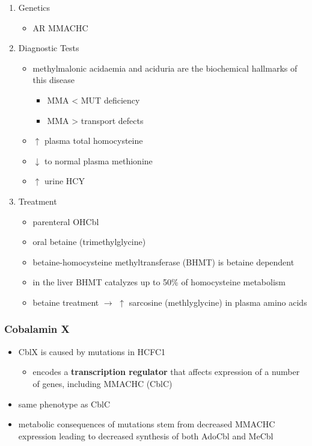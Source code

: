 \documentclass[12pt]{scrartcl}
\begin{document}
\begin{enumerate}
\item Genetics
\label{sec:org58ce603}
\begin{itemize}
\item AR MMACHC
\end{itemize}

\item Diagnostic Tests
\label{sec:org50820a2}
\begin{itemize}
\item methylmalonic acidaemia and aciduria are the
biochemical hallmarks of this disease
\begin{itemize}
\item MMA \textless{} MUT deficiency
\item MMA \textgreater{} transport defects
\end{itemize}
\item \(\uparrow\) plasma total homocysteine
\item \(\downarrow\) to normal plasma methionine
\item \(\uparrow\) urine HCY
\end{itemize}

\item Treatment
\label{sec:org2835009}
\begin{itemize}
\item parenteral OHCbl
\item oral betaine (trimethylglycine)
\item betaine-homocysteine methyltransferase (BHMT) is betaine dependent
\end{itemize}
\begin{itemize}
\item in the liver BHMT catalyzes up to 50\% of homocysteine metabolism
\item betaine treatment \(\to\) \(\uparrow\) sarcosine (methlyglycine) in plasma amino acids
\end{itemize}
\end{enumerate}

\subsubsection{Cobalamin X}
\label{sec:orgd0ce4d1}
\begin{itemize}
\item CblX is caused by mutations in HCFC1
\begin{itemize}
\item encodes a \textbf{transcription regulator} that affects expression of a
number of genes, including MMACHC (CblC)
\end{itemize}
\item same phenotype as CblC
\item metabolic consequences of mutations stem from decreased MMACHC
expression leading to decreased synthesis of both AdoCbl and MeCbl
\end{itemize}
\end{document}
